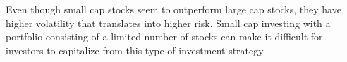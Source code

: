\indent\newline   
Even though small cap stocks seem to outperform large cap stocks, they have higher volatility that translates into higher risk. Small cap investing with a portfolio consisting of a limited number of stocks can make it difficult for investors to capitalize from this type of investment strategy. 
